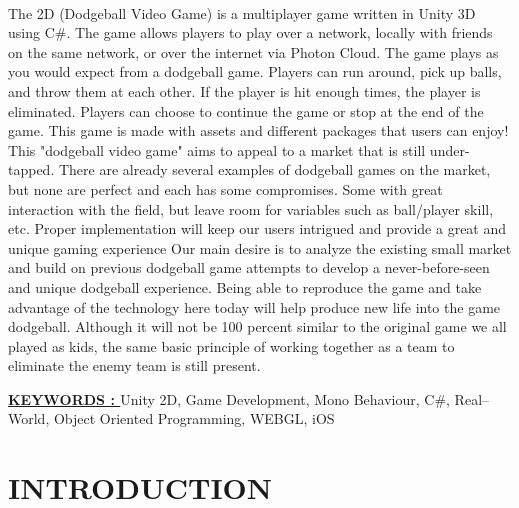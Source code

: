 \documentclass[12pt]{report}
\begin{document}
\vspace{4 cm}
\\
\vspace{1 cm}
\justifying
\setlength{\parindent}{4em}
\setlength{\parskip}{1em}
\renewcommand{\baselinestretch}{1.5}
\normalsize
The 2D (Dodgeball Video Game) is a multiplayer game written in Unity 3D using C\#. The game allows players to play over a network, locally with friends on the same network, or over the internet via Photon Cloud. The game plays as you would expect from a dodgeball game. Players can run around, pick up balls, and throw them at each other. If the player is hit enough times, the player is eliminated. Players can choose to continue the game or stop at the end of the game. This game is made with assets and different packages that users can enjoy! This "dodgeball video game" aims to appeal to a market that is still under-tapped. There are already several examples of dodgeball games on the market, but none are perfect and each has some compromises. Some with great interaction with the field, but leave room for variables such as ball/player skill, etc. Proper implementation will keep our users intrigued  and provide a great and unique gaming experience Our main desire is to analyze the existing small market and build on previous dodgeball game attempts to develop a never-before-seen and unique dodgeball experience. Being able to reproduce the game and take advantage of the technology here today will help produce new life into the game dodgeball. Although it will not be 100 percent similar to the original game we all played as kids, the same basic principle of working together as a team to eliminate the enemy team is still present.

\raggedright{ \textbf \underline{KEYWORDS : }}Unity 2D, Game Development, Mono Behaviour, C\#, Real–World, Object Oriented Programming, WEBGL, iOS

\clearpage



\tableofcontents
\clearpage

\listoffigures
\thispagestyle{empty}
\clearpage
{}
\fancyhead[R]{\thepage}

\centering
\section{INTRODUCTION}
\raggedright
\end{document}
